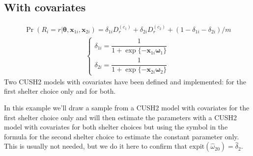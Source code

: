 \documentclass[letterpaper,10pt,english]{sphinxmanual}
\begin{document}
\subsection{With covariates}
\label{\detokenize{manual:cush2-with-covariates}}\label{\detokenize{manual:id157}}
\sphinxAtStartPar
{}

\sphinxAtStartPar
{}
\begin{equation*}
\begin{split}\Pr(R_i=r|\pmb\theta,\pmb x_{1i}, \pmb x_{2i}) = \delta_{1i} D_r^{(c_1)} + \delta_{2i} D_r^{(c_2)} + (1-\delta_{1i}- \delta_{2i})/m\end{split}
\end{equation*}\begin{equation*}
\begin{split}\left\{
\begin{array}{l}
    \delta_{1i} = \dfrac{1}{1+\exp\{ - \pmb x_{1i} \pmb\omega_1 \}}
    \\
    \delta_{2i} = \dfrac{1}{1+\exp\{ - \pmb x_{2i} \pmb\omega_2 \}}
\end{array}
\right.\end{split}
\end{equation*}
\sphinxAtStartPar
Two CUSH2 models with covariates have been defined and implemented:
for the first shelter choice only and for both.

\sphinxAtStartPar
In this example we’ll draw a sample from a CUSH2 model with
covariates for the first shelter choice only and will then
estimate the parameters with a CUSH2 model with covariates
for both shelter choices but using the symbol  in the
formula for the second shelter choice to estimate the
constant parameter only. This is usually not needed, but
we do it here to confirm that \(\mathrm{expit}(\hat\omega_{20})=\hat\delta_2\).
\end{document}
